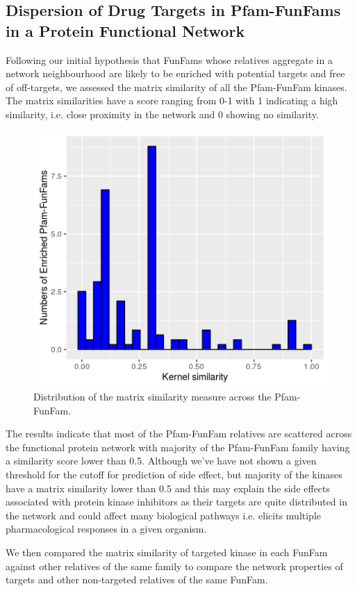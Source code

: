 \documentclass[a4paper, 11pt]{article}
\begin{document}
\subsection*{Dispersion of Drug Targets in Pfam-FunFams in a Protein Functional Network}
Following our initial hypothesis that FunFams whose relatives aggregate in a network neighbourhood are likely to be enriched with potential targets and free of off-targets, we assessed the matrix similarity of all the Pfam-FunFam kinases.  The matrix similarities have a score ranging from 0-1 with 1 indicating a high similarity, i.e. close proximity in the network and 0 showing no similarity. 
\begin{figure}[H]
	\includegraphics[width=.8\linewidth]{figures/ksim_plot.png}
	\centering
	\caption{Distribution of the matrix similarity measure across the Pfam-FunFam.}
	\label{ksim_plot}
\end{figure}
The results indicate that most of the Pfam-FunFam relatives are scattered across the functional protein network with majority of the Pfam-FunFam family having a similarity score lower than 0.5. Although we've have not shown a given threshold for the cutoff for prediction of side effect, but majority of the kinases have a matrix similarity lower than 0.5 and this may explain the side effects associated with protein kinase inhibitors as their targets are quite distributed in the network and could affect many biological pathways i.e. elicits multiple pharmacological responses in a given organism.\par
We then compared the matrix similarity of targeted kinase in each FunFam against other relatives of the same family to compare the network properties of targets and other non-targeted relatives of the same FunFam. 
\end{document}
